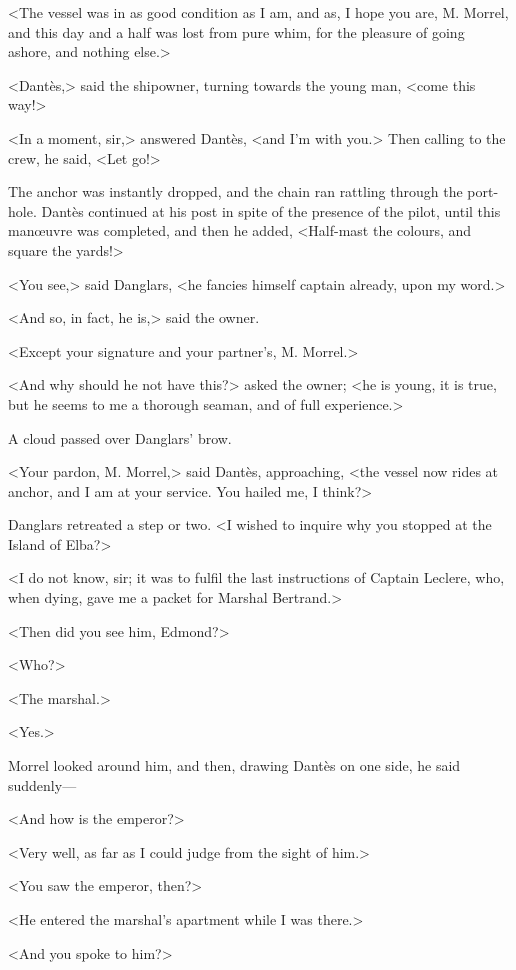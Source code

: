  <The vessel was in as good condition as I am, and as, I hope you are, M. Morrel, and this day and a half was lost from pure whim, for the pleasure of going ashore, and nothing else.> 

 <Dantès,> said the shipowner, turning towards the young man, <come this way!> 

 <In a moment, sir,> answered Dantès, <and I'm with you.> Then calling to the crew, he said, <Let go!> 

 The anchor was instantly dropped, and the chain ran rattling through the port-hole. Dantès continued at his post in spite of the presence of the pilot, until this manœuvre was completed, and then he added, <Half-mast the colours, and square the yards!> 

 <You see,> said Danglars, <he fancies himself captain already, upon my word.> 

 <And so, in fact, he is,> said the owner. 

 <Except your signature and your partner's, M. Morrel.> 

 <And why should he not have this?> asked the owner; <he is young, it is true, but he seems to me a thorough seaman, and of full experience.> 

 A cloud passed over Danglars' brow. 

 <Your pardon, M. Morrel,> said Dantès, approaching, <the vessel now rides at anchor, and I am at your service. You hailed me, I think?> 

 Danglars retreated a step or two. <I wished to inquire why you stopped at the Island of Elba?> 

 <I do not know, sir; it was to fulfil the last instructions of Captain Leclere, who, when dying, gave me a packet for Marshal Bertrand.> 

 <Then did you see him, Edmond?> 

 <Who?> 

 <The marshal.> 

 <Yes.> 

 Morrel looked around him, and then, drawing Dantès on one side, he said suddenly— 

 <And how is the emperor?> 

 <Very well, as far as I could judge from the sight of him.> 

 <You saw the emperor, then?> 

 <He entered the marshal's apartment while I was there.> 

 <And you spoke to him?> 

